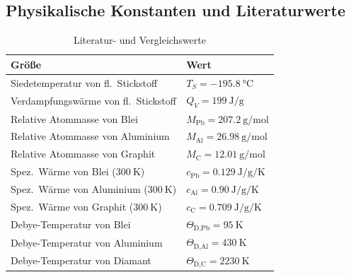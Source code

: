 \subsection{Physikalische Konstanten und Literaturwerte}
\renewcommand{\arraystretch}{1.2}  
\begin{table}[htbp]
\centering
\caption{Literatur- und Vergleichswerte \autocite{Skript_1}}
\begin{tabular}{|p{8cm}|p{4cm}|}
\hline
\rule{0pt}{2.5ex}Größe & Wert \\
\hline
Siedetemperatur von fl.\ Stickstoff & \(T_S = \qty{-195,8}{\degreeCelsius}\) \\
Verdampfungswärme von fl.\ Stickstoff & \(Q_V = \qty{199}{\J\per\g}\) \\
Relative Atommasse von Blei & \(M_{\text{Pb}} = \qty{207,2}{\g\per\mol}\) \\
Relative Atommasse von Aluminium & \(M_{\text{Al}} = \qty{26,98}{\g\per\mol}\) \\
Relative Atommasse von Graphit & \(M_{\text{C}} = \qty{12,01}{\g\per\mol}\) \\
Spez.\ Wärme von Blei (\(\qty{300}{\K}\)) & \(c_{\text{Pb}} = \qty{0,129}{\J\per\g\per\K}\) \\
Spez.\ Wärme von Aluminium (\(\qty{300}{\K}\)) & \(c_{\text{Al}} = \qty{0,90}{\J\per\g\per\K}\) \\
Spez.\ Wärme von Graphit (\(\qty{300}{\K}\)) & \(c_{\text{C}} = \qty{0,709}{\J\per\g\per\K}\) \\
Debye-Temperatur von Blei & \(\Theta_{\text{D,Pb}} = \qty{95}{\K}\) \\
Debye-Temperatur von Aluminium & \(\Theta_{\text{D,Al}} = \qty{430}{\K}\) \\
Debye-Temperatur von Diamant & \(\Theta_{\text{D,C}} = \qty{2230}{\K}\) \\
\hline
\end{tabular}
\label{table:Literatur}
\end{table}